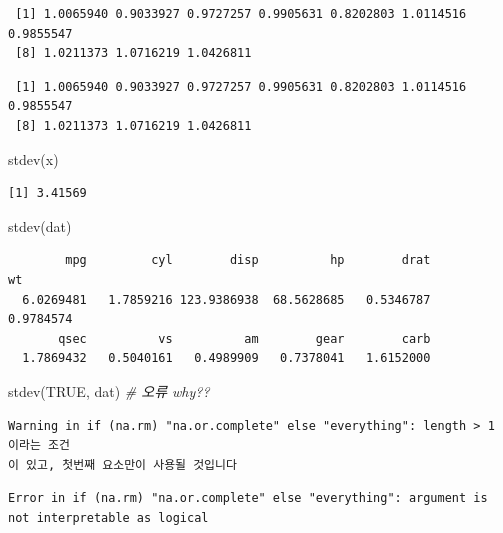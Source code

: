 \documentclass[
  11pt,
]{krantz}
\newenvironment{Shaded}{\begin{snugshade}}{\end{snugshade}}
\newcommand{\CommentTok}[1]{\textcolor[rgb]{0.37,0.37,0.37}{\textit{#1}}}
\newcommand{\ConstantTok}[1]{\textcolor[rgb]{0,0,0}{#1}}
\newcommand{\FunctionTok}[1]{\textcolor[rgb]{0,0,0}{#1}}
\newcommand{\NormalTok}[1]{#1}
\begin{document}
\begin{verbatim}
 [1] 1.0065940 0.9033927 0.9727257 0.9905631 0.8202803 1.0114516 0.9855547
 [8] 1.0211373 1.0716219 1.0426811
\end{verbatim}

\begin{verbatim}
 [1] 1.0065940 0.9033927 0.9727257 0.9905631 0.8202803 1.0114516 0.9855547
 [8] 1.0211373 1.0716219 1.0426811
\end{verbatim}

\begin{Shaded}
\begin{Highlighting}[]
\FunctionTok{stdev}\NormalTok{(x)}
\end{Highlighting}
\end{Shaded}

\begin{verbatim}
[1] 3.41569
\end{verbatim}

\begin{Shaded}
\begin{Highlighting}[]
\FunctionTok{stdev}\NormalTok{(dat)}
\end{Highlighting}
\end{Shaded}

\begin{verbatim}
        mpg         cyl        disp          hp        drat          wt 
  6.0269481   1.7859216 123.9386938  68.5628685   0.5346787   0.9784574 
       qsec          vs          am        gear        carb 
  1.7869432   0.5040161   0.4989909   0.7378041   1.6152000 
\end{verbatim}

\begin{Shaded}
\begin{Highlighting}[]
\FunctionTok{stdev}\NormalTok{(}\ConstantTok{TRUE}\NormalTok{, dat) }\CommentTok{\# 오류 why??}
\end{Highlighting}
\end{Shaded}

\begin{verbatim}
Warning in if (na.rm) "na.or.complete" else "everything": length > 1 이라는 조건
이 있고, 첫번째 요소만이 사용될 것입니다
\end{verbatim}

\begin{verbatim}
Error in if (na.rm) "na.or.complete" else "everything": argument is not interpretable as logical
\end{verbatim}
\end{document}
